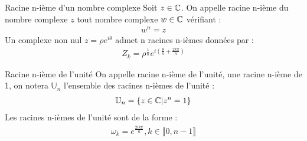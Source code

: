 \begin{definition}{Racine n-ième d'un nombre complexe}
    Soit $z \in \mathbb{C}$. On appelle racine n-ième du nombre complexe $z$ tout nombre complexe $w \in \mathbb{C}$ vérifiant :
    \begin{align*}
        w^n = z
    \end{align*}
    Un complexe non nul $z = \rho e^{i\theta}$ admet n racines n-ièmes données par :
    \begin{align*}
        Z_k = \rho^{\frac{1}{n}} e^{i\left(\frac{\theta}{n} + \frac{2k\pi}{n} \right)} 
    \end{align*}
\end{definition}

\begin{definition}{Racine n-ième de l'unité}
    On appelle racine n-ième de l'unité, une racine n-ième de 1, on notera $\mathbb{U}_n$ l'ensemble des racines n-ièmes de l'unité :
    \begin{align*}
        \mathbb{U}_n = \{z \in \mathbb{C} | z^n = 1 \}
    \end{align*}
    Les racines n-ièmes de l'unité sont de la forme :
    \begin{align*}
        \omega_k = e^{\frac{2ik\pi}{n}}, k \in \llbracket 0, n - 1 \rrbracket
    \end{align*}

\end{definition}


